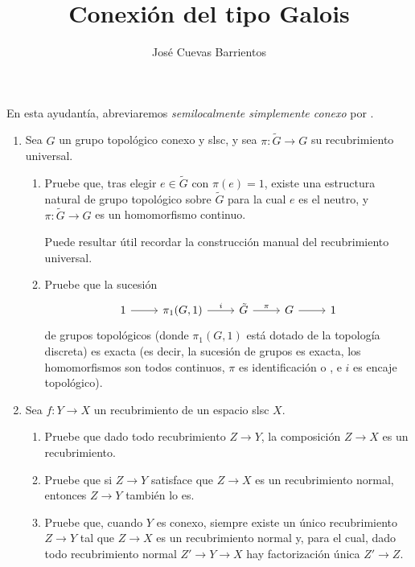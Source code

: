 \documentclass[11pt, reqno]{amsart}
\title{Conexión del tipo Galois}
\date{\DTMdate{2026-10-22}}
\author{José Cuevas Barrientos}
\begin{document}
\maketitle

En esta ayudantía, abreviaremos \emph{semilocalmente simplemente conexo} por .

\begin{enumerate}
	\item Sea $G$ un grupo topológico conexo y slsc, y sea $\pi \colon \tilde G \to G$ su recubrimiento universal.
		\begin{enumerate}
			\item Pruebe que, tras elegir $e \in \tilde G$ con $\pi(e) = 1$, existe una estructura natural de
				grupo topológico sobre $\tilde G$ para la cual $e$ es el neutro, y $\pi \colon \tilde G \to G$ es un homomorfismo continuo.
				\begin{hint}
					Puede resultar útil recordar la construcción manual del recubrimiento universal.
				\end{hint}

			\item\lookright
				Pruebe que la sucesión
				\[\begin{tikzcd}
					1 \rar & \pi_1(G, 1) \rar["i"] & \tilde G \rar["\pi"] & G \rar & 1
				\end{tikzcd}\]
				de grupos topológicos (donde $\pi_1(G, 1)$ está dotado de la topología discreta) es exacta
				(es decir, la sucesión de grupos es exacta, los homomorfismos son todos continuos, $\pi$ es identificación o
				, e $i$ es encaje topológico).
		\end{enumerate}

	\item Sea $f\colon Y \to X$ un recubrimiento de un espacio slsc $X$.
		\begin{enumerate}
			\item Pruebe que dado todo recubrimiento $Z \to Y$, la composición $Z \to X$ es un recubrimiento.
			\item Pruebe que si $Z \to Y$ satisface que $Z \to X$ es un recubrimiento normal, entonces $Z \to Y$ también lo es.
			\item\lookst
				Pruebe que, cuando $Y$ es conexo, siempre existe un único recubrimiento $Z \to Y$ tal que $Z \to X$ es un
				recubrimiento normal y, para el cual, dado todo recubrimiento normal $Z' \to Y \to X$ hay factorización
				única $Z' \to Z$.
		\end{enumerate}


\end{enumerate}
\end{document}
